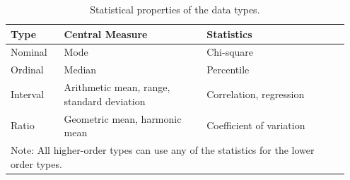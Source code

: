 \begin{table}[H]
	\centering
	\begin{tabularx}{0.95\linewidth}{p{0.15\linewidth}p{0.40\linewidth}p{0.40\linewidth}}
		\toprule
		\textbf{Type} & \textbf{Central Measure} & \textbf{Statistics} \\
		\midrule
		Nominal & Mode & Chi-square \\
		Ordinal & Median & Percentile \\
		Interval & Arithmetic mean, range, standard deviation & Correlation, regression \\
		Ratio & Geometric mean, harmonic mean & Coefficient of variation \\
		\midrule
		\multicolumn{3}{p{0.95\linewidth}}{Note: All higher-order types can use any of the statistics for the lower order types.} \\	
		\bottomrule
	\end{tabularx}
	\caption{Statistical properties of the data types.}
	\label{tab06.01}
\end{table}

